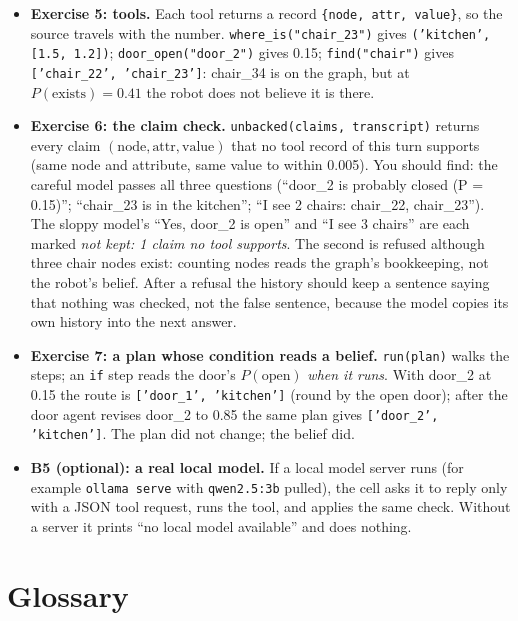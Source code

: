 \documentclass[11pt]{article}
\begin{document}
\begin{itemize}
\item \textbf{Exercise 5: tools.} Each tool returns a record \texttt{\{node, attr, value\}}, so the source travels with the number. \texttt{where\_is("chair\_23")} gives \texttt{('kitchen', [1.5, 1.2])}; \texttt{door\_open("door\_2")} gives 0.15; \texttt{find("chair")} gives \texttt{['chair\_22', 'chair\_23']}: chair\_34 is on the graph, but at $P(\text{exists})=0.41$ the robot does not believe it is there.
\item \textbf{Exercise 6: the claim check.} \texttt{unbacked(claims, transcript)} returns every claim $(\text{node},\text{attr},\text{value})$ that no tool record of this turn supports (same node and attribute, same value to within 0.005). You should find: the careful model passes all three questions (``door\_2 is probably closed (P = 0.15)''; ``chair\_23 is in the kitchen''; ``I see 2 chairs: chair\_22, chair\_23''). The sloppy model's ``Yes, door\_2 is open'' and ``I see 3 chairs'' are each marked \emph{not kept: 1 claim no tool supports}. The second is refused although three chair nodes exist: counting nodes reads the graph's bookkeeping, not the robot's belief. After a refusal the history should keep a sentence saying that nothing was checked, not the false sentence, because the model copies its own history into the next answer.
\item \textbf{Exercise 7: a plan whose condition reads a belief.} \texttt{run(plan)} walks the steps; an \texttt{if} step reads the door's $P(\text{open})$ \emph{when it runs}. With door\_2 at 0.15 the route is \texttt{['door\_1', 'kitchen']} (round by the open door); after the door agent revises door\_2 to 0.85 the same plan gives \texttt{['door\_2', 'kitchen']}. The plan did not change; the belief did.
\item \textbf{B5 (optional): a real local model.} If a local model server runs (for example \texttt{ollama serve} with \texttt{qwen2.5:3b} pulled), the cell asks it to reply only with a JSON tool request, runs the tool, and applies the same check. Without a server it prints ``no local model available'' and does nothing.
\end{itemize}

\section{Glossary}
\end{document}
